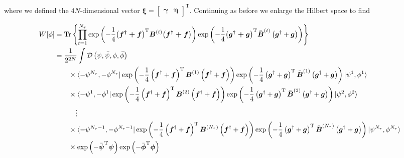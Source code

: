 \documentclass{article}
\begin{document}
where we defined the $4N$-dimensional vector $\boldsymbol{\xi} = \begin{bmatrix} \boldsymbol{\gamma} & \boldsymbol{\eta} \end{bmatrix}^\mathrm{T}$. Continuing as before we enlarge the Hilbert space to find

\begin{align}
	W[\phi] &=\mathrm{Tr} \left\{\prod_{t=1}^{N_\tau}\exp \left( -\frac{1}{4}\boldsymbol{\left(f^\dagger + f\right)}^\mathrm{T} \boldsymbol{B}^{(t)}\boldsymbol{\left(f^\dagger + f\right)}  \right) 
	\exp \left( -\frac{1}{4}\boldsymbol{\left(\boldsymbol{g}^\dagger + \boldsymbol{g} \right) }^\mathrm{T} \bar{\boldsymbol{B}}^{(t)}\left(\boldsymbol{g}^\dagger + \boldsymbol{g} \right)  \right)  \right\} \nonumber \\
	&= \frac{1}{2^{2N}}\int_{ }^{ } \mathcal{D}\left(\psi,\bar{\psi},\phi, \bar{\phi} \right) \nonumber \\
	&\quad\quad \times\bra{-\psi^{N_\tau},-\phi^{N_\tau}} \exp \left( -\frac{1}{4}\left(\boldsymbol{f}^\dagger + \boldsymbol{f}\right)^\mathrm{T}  \boldsymbol{B}^{(1)}  \left(\boldsymbol{f}^\dagger + \boldsymbol{f}\right)\right)  \exp \left( -\frac{1}{4}\left(\boldsymbol{g}^\dagger + \boldsymbol{g}\right)^\mathrm{T}  \bar{\boldsymbol{B}}^{(1)}  \left(\boldsymbol{g}^\dagger + \boldsymbol{g}\right)\right)\ket{\psi^1,\phi^1} \nonumber \\
	&\quad\quad\times \bra{-\psi^1,-\phi^1} \exp \left( -\frac{1}{4}\left(\boldsymbol{f}^\dagger + \boldsymbol{f}\right)^\mathrm{T}  \boldsymbol{B}^{(2)}  \left(\boldsymbol{f}^\dagger + \boldsymbol{f}\right)\right)  \exp \left( -\frac{1}{4}\left(\boldsymbol{g}^\dagger + \boldsymbol{g}\right)^\mathrm{T}  \bar{\boldsymbol{B}}^{(2)}  \left(\boldsymbol{g}^\dagger + \boldsymbol{g}\right)\right)\ket{\psi^2,\phi^2}\nonumber \\
	&\quad\quad\quad\vdots \nonumber \\
	&\quad\quad\times \bra{-\psi^{N_\tau-1},-\phi^{N_\tau-1}} \exp \left( -\frac{1}{4}\left(\boldsymbol{f}^\dagger + \boldsymbol{f}\right)^\mathrm{T}  \boldsymbol{B}^{(N_\tau)}  \left(\boldsymbol{f}^\dagger + \boldsymbol{f}\right)\right)  \exp \left( -\frac{1}{4}\left(\boldsymbol{g}^\dagger + \boldsymbol{g}\right)^\mathrm{T}  \bar{\boldsymbol{B}}^{(N_\tau)}  \left(\boldsymbol{g}^\dagger + \boldsymbol{g}\right)\right)\ket{\psi^{N_\tau},\phi^{N_\tau}}
	\nonumber \\
	&\quad\quad\times\exp \left( -\bar{\boldsymbol{\psi} }^\mathrm{T} \boldsymbol{\psi}  \right) \exp \left( -\bar{\boldsymbol{\phi} }^\mathrm{T} \boldsymbol{\phi}\right)  
\end{align}
\end{document}
